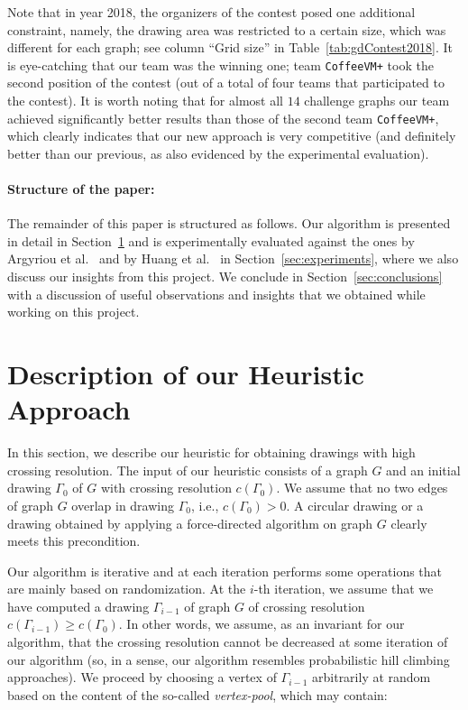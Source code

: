 \documentclass{comjnl}
\begin{document}
Note that in year 2018, the organizers of the contest posed one additional constraint, namely, the drawing area was restricted to a certain size, which was different for each graph; see column ``Grid size'' in Table~\ref{tab:gdContest2018}. It is eye-catching that our team was the winning one; team \texttt{CoffeeVM+} took the second position of the contest (out of a total of four teams that participated to the contest). It is worth noting that for almost all $14$ challenge graphs our team achieved significantly better results than those of the second team \texttt{CoffeeVM+}, which clearly indicates that our new approach is very competitive (and definitely better than our previous,  as also evidenced by the experimental evaluation).

\paragraph{Structure of the paper:}
The remainder of this paper is structured as follows. 
Our algorithm is presented in detail in Section~\ref{sec:algorithm} and is experimentally evaluated against the ones by Argyriou et al.~\cite{DBLP:journals/cj/ArgyriouBS13} and by Huang et al.~\cite{DBLP:journals/vlc/HuangEHL13} in Section~\ref{sec:experiments}, where we also discuss our insights from this project. We conclude in Section~\ref{sec:conclusions} with a discussion of useful observations and insights that we obtained while working on this project.

\section{Description of our Heuristic Approach}
\label{sec:algorithm}

In this section, we describe our heuristic for obtaining drawings with high crossing resolution. The input of our heuristic consists of a graph $G$ and an initial drawing $\Gamma_0$ of $G$ with crossing resolution $c(\Gamma_0)$. We assume that no two edges of graph $G$ overlap in drawing $\Gamma_0$, i.e., $c(\Gamma_0)>0$. A circular drawing or a drawing obtained by applying a force-directed algorithm on graph $G$ clearly meets this precondition.

Our algorithm is iterative and at each iteration performs some operations that are mainly based on randomization. At the $i$-th iteration, we assume that we have computed a drawing $\Gamma_{i-1}$ of graph $G$ of crossing resolution $c(\Gamma_{i-1}) \geq c(\Gamma_0)$. In other words, we assume, as an invariant for our algorithm, that the crossing resolution cannot be decreased at some iteration of our algorithm (so, in a sense, our algorithm resembles probabilistic hill climbing approaches). We proceed by choosing a vertex of $\Gamma_{i-1}$ arbitrarily at random based on the content of the so-called \emph{vertex-pool}, which may contain:
\end{document}

